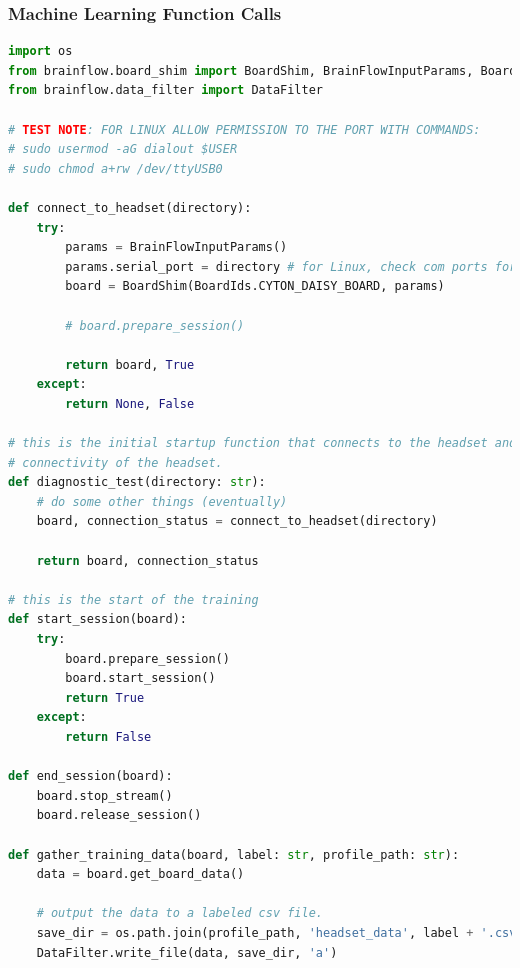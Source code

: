 \documentclass[conference]{IEEEtran}
\begin{document}
    \subsubsection{Machine Learning Function Calls}
    \begin{lstlisting}[language=Python, caption=Headset Initialization Code, label=headset_init]
    import os
from brainflow.board_shim import BoardShim, BrainFlowInputParams, BoardIds
from brainflow.data_filter import DataFilter

# TEST NOTE: FOR LINUX ALLOW PERMISSION TO THE PORT WITH COMMANDS:
# sudo usermod -aG dialout $USER
# sudo chmod a+rw /dev/ttyUSB0

def connect_to_headset(directory):
    try: 
        params = BrainFlowInputParams()
        params.serial_port = directory # for Linux, check com ports for windows
        board = BoardShim(BoardIds.CYTON_DAISY_BOARD, params)

        # board.prepare_session()
        
        return board, True
    except:
        return None, False

# this is the initial startup function that connects to the headset and does a health check on the 
# connectivity of the headset. 
def diagnostic_test(directory: str):
    # do some other things (eventually)
    board, connection_status = connect_to_headset(directory)

    return board, connection_status

# this is the start of the training
def start_session(board):
    try:
        board.prepare_session()
        board.start_session()
        return True
    except:
        return False
    
def end_session(board):
    board.stop_stream()
    board.release_session()

def gather_training_data(board, label: str, profile_path: str):
    data = board.get_board_data()
    
    # output the data to a labeled csv file. 
    save_dir = os.path.join(profile_path, 'headset_data', label + '.csv')
    DataFilter.write_file(data, save_dir, 'a')
    \end{lstlisting}
\end{document}
